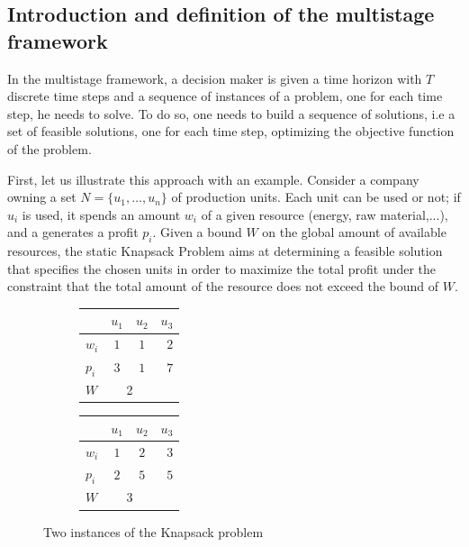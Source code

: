 \documentclass[a4paper]{book}
\begin{document}
\subsection{Introduction and definition of the multistage framework}\label{multiintro}

In the multistage framework, a decision maker is given a time horizon with $T$ discrete time steps and a sequence of instances of a problem, one for each time step, he needs to solve. To do so, one needs to build a sequence of solutions, i.e a set of feasible solutions, one for each time step, optimizing the objective function of the problem. 

First, let us illustrate this approach with an example. Consider a company owning a set $N=\{u_1,\ldots,u_n\}$ of production units. Each unit can be used or not; if $u_i$ is used, it spends an amount $w_i$ of a given resource (energy, raw material,...), and a generates a profit $p_i$. Given a bound $W$ on the global amount of available resources, the static {\sc Knapsack Problem} aims at determining a feasible solution that specifies the chosen units in order to maximize the total profit under the constraint that the total amount of the resource does not exceed the bound of $W$.

\begin{figure}[h]
\centering
\begin{subfigure}[b]{0.4\textwidth}
\begin{tabular}{|l|c|c|r|}
  \hline
   &$u_1$&$u_2$&$u_3$ \\
  \hline
 $w_{i}$ & $1$ & $1$ & $2$\\
    \hline
  $p_{i} $& $3$ & $1$ & $7$\\
  \hline
  $W$ & \multicolumn{2}{c}{\text{   }2} &\\
  \hline
\end{tabular}
\end{subfigure}
\begin{subfigure}[b]{0.4\textwidth}
\begin{tabular}{|l|c|c|r|}
  \hline
   &$u_1$&$u_2$&$u_3$ \\
  \hline
 $w_{i}$ & $1$ & $2$ & $3$\\
    \hline
  $p_{i} $& $2$ & $5$ & $5$\\
  \hline
   $W$ & \multicolumn{2}{c}{\text{     }3} &\\
  \hline
\end{tabular}
\end{subfigure}
\caption{Two instances of the {\sc Knapsack} problem}
\label{statickp}
\end{figure}
\end{document}
